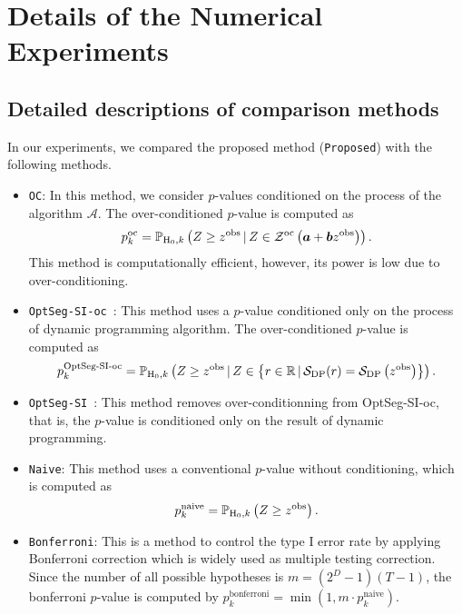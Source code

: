 \section{Details of the Numerical Experiments}
\label{Experimental_Details}

\subsection{Detailed descriptions of comparison methods}
\label{Detailed_descriptions_of_comparison_methods}
In our experiments, we compared the proposed method (\texttt{Proposed}) with the following methods.
\begin{itemize}
  \item \texttt{OC}: In this method, we consider $p$-values conditioned on the process of the algorithm $\mathcal{A}$. 
        The over-conditioned $p$-value is computed as
  \begin{equation}
    p_k^{\text{oc}} = \mathbb{P}_{\text{H}_0,k} \left(Z \geq z^{\text{obs}} \, | \, Z \in \mathcal{Z}^{\text{oc}}\left(\bm{a}+\bm{b}z^{\text{obs}}\right)\right). \notag
  \end{equation}
  This method is computationally efficient, however, its power is low due to over-conditioning.
  \item \texttt{OptSeg-SI-oc}~\citep{duy2020computing}: This method uses a $p$-value conditioned only on the process of dynamic programming algorithm. 
  The over-conditioned $p$-value is computed as
  \begin{equation}
    p_k^{\text{OptSeg-SI-oc}} = \mathbb{P}_{\text{H}_0,k} \left(Z \geq z^{\text{obs}} \, | \, Z \in  \left\{r \in \mathbb{R} \, | \, \mathcal{S}_{\text{DP}}(r) = \mathcal{S}_{\text{DP}}\left(z^{\text{obs}}\right)\right\}\right). \notag
  \end{equation}
  \item \texttt{OptSeg-SI}~\citep{duy2020computing}: This method removes over-conditionning from OptSeg-SI-oc, that is, 
        the $p$-value is conditioned only on the result of dynamic programming. 
  \item \texttt{Naive}: This method uses a conventional $p$-value without conditioning, which is computed as
  \begin{equation}
    p_k^{\text{naive}} = \mathbb{P}_{\text{H}_0,k} \left(Z \geq z^{\text{obs}}\right). \notag
  \end{equation}
  \item \texttt{Bonferroni}: This is a method to control the type I error rate by applying Bonferroni correction which is widely used as multiple testing correction.
        Since the number of all possible hypotheses is $m = (2^{D}-1)(T-1)$, the bonferroni $p$-value is computed by $p_k^{\text{bonferroni}} = \min(1, m \cdot p_k^{\text{naive}})$.
\end{itemize}

